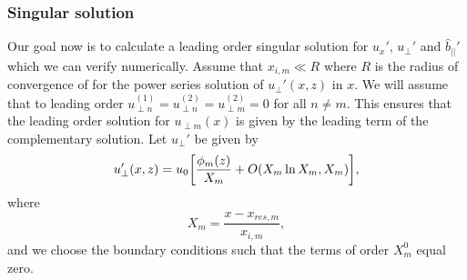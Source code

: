 
\subsubsection{Singular solution}

Our goal  now is to calculate a leading order singular solution for $u_x'$, $u_\perp'$ and $\hat{b}_{||}'$ which we can verify numerically.
Assume that $x_{i,m}\ll R$ where $R$ is the radius of convergence of for the power series solution of $u_\perp'(x,z)$ in $x$. We will assume that to leading order $u_{\perp n}^{(1)}=u_{\perp n}^{(2)}=u_{\perp m}^{(2)}=0$ for all $n\ne m$. This ensures that the leading order solution for $u_{\perp m}(x)$ is given by the leading term of the complementary solution. Let $u_\perp'$ be given by
\begin{equation}
    \label{eq:chap_4_oblique_u_perp_final}
    u_\perp'(x,z) = u_0\qty[\frac{\phi_m(z)}{X_{m}} + O(X_m\ln X_m,X_m)],
\end{equation}
where
\begin{equation}
    X_m=\frac{x - x_{res,m}}{x_{i,m}},
\end{equation}
and we choose the boundary conditions such that the terms of order $X_m^0$ equal zero.

